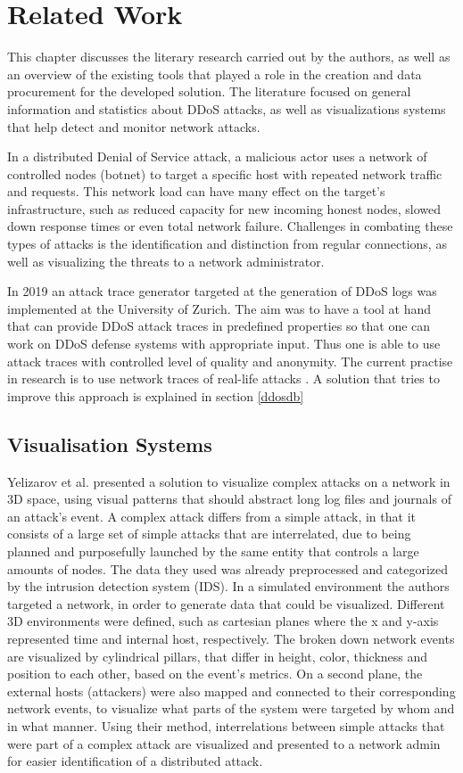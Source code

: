 \chapter{Related Work}
This chapter discusses the literary research carried out by the authors, as well as an overview of the existing tools that played a role in the creation and data procurement for the developed solution. The literature focused on general information and statistics about DDoS attacks, as well as visualizations systems that help detect and monitor network attacks.

In a distributed Denial of Service attack, a malicious actor uses a network of controlled nodes (botnet) to target a specific host with repeated network traffic and requests. This network load can have many effect on the target's infrastructure, such as reduced capacity for new incoming honest nodes, slowed down response times or even total network failure. Challenges in combating these types of attacks is the identification and distinction from regular connections, as well as visualizing the threats to a network administrator.

In 2019 an attack trace generator targeted at the generation of DDoS logs was implemented at the University of Zurich. The aim was to have a tool at hand that can provide DDoS attack traces in predefined properties so that one can work on DDoS defense systems with appropriate input. Thus one is able to use attack traces with controlled level of quality and anonymity. The current practise in research is to use network traces of real-life attacks \cite{ddoslogsim}. A solution that tries to improve this approach is explained in section \ref{ddosdb}

\section{Visualisation Systems}
Yelizarov et al.\cite{yelizarov} presented a solution to visualize complex attacks on a network in 3D space, using visual patterns that should abstract long log files and journals of an attack's event. A complex attack differs from a simple attack, in that it consists of a large set of simple attacks that are interrelated, due to being planned and purposefully launched by the same entity that controls a large amounts of nodes. The data they used was already preprocessed and categorized by the intrusion detection system (IDS). In a simulated environment the authors targeted a network, in order to generate data that could be visualized. Different 3D environments were defined, such as cartesian planes where the x and y-axis represented time and internal host, respectively. The broken down network events are visualized by cylindrical pillars, that differ in height, color, thickness and position to each other, based on the event's metrics. On a second plane, the external hosts (attackers) were also mapped and connected to their corresponding network events, to visualize what parts of the system were targeted by whom and in what manner. Using their method, interrelations between simple attacks that were part of a complex attack are visualized and presented to a network admin for easier identification of a distributed attack.

